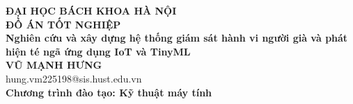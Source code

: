 \documentclass[DoAn.tex]{subfiles}
\begin{document}
\begin{titlepage}
\thispagestyle{empty}

\begin{center}

{\textbf{\large{ĐẠI HỌC BÁCH KHOA HÀ NỘI}}}\\[4cm]

{\textbf{\huge{ĐỒ ÁN TỐT NGHIỆP}}}\\[0.8cm]
{\textbf{\Large{Nghiên cứu và xây dựng hệ thống giám sát hành vi người già và phát hiện té ngã ứng dụng IoT và TinyML}}}\\[1cm]

{\textbf{\large{VŨ MẠNH HƯNG}}}\\
{\large{hung.vm225198@sis.hust.edu.vn}}\\[0.4cm]

{\textbf{\large{Chương trình đào tạo: Kỹ thuật máy tính}}}\\

\vspace{\fill} %

\begin{flushleft} %
\centering
{}
\end{flushleft}

\end{center}
\end{titlepage}
\end{document}
